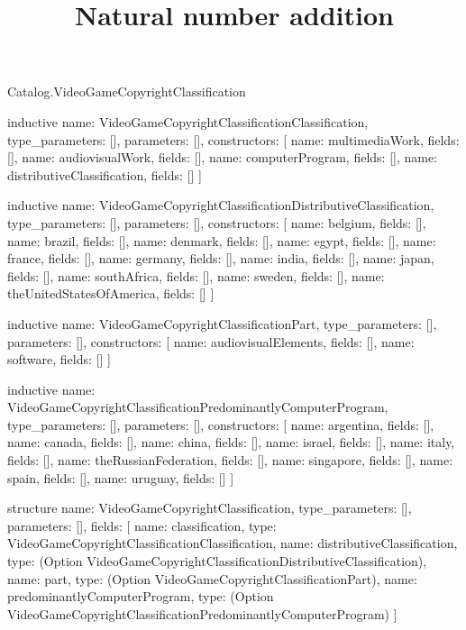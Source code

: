 \begin{lexlean}{Catalog.VideoGameCopyrightClassification}
\title{Natural number addition}
\begin{semanticmodule}
inductive{
  name: VideoGameCopyrightClassificationClassification,
  type_parameters: [],
  parameters: [],
  constructors: [
    {name: multimediaWork, fields: []},
    {name: audiovisualWork, fields: []},
    {name: computerProgram, fields: []},
    {name: distributiveClassification, fields: []}
  ]
}

inductive{
  name: VideoGameCopyrightClassificationDistributiveClassification,
  type_parameters: [],
  parameters: [],
  constructors: [
    {name: belgium, fields: []},
    {name: brazil, fields: []},
    {name: denmark, fields: []},
    {name: egypt, fields: []},
    {name: france, fields: []},
    {name: germany, fields: []},
    {name: india, fields: []},
    {name: japan, fields: []},
    {name: southAfrica, fields: []},
    {name: sweden, fields: []},
    {name: theUnitedStatesOfAmerica, fields: []}
  ]
}

inductive{
  name: VideoGameCopyrightClassificationPart,
  type_parameters: [],
  parameters: [],
  constructors: [
    {name: audiovisualElements, fields: []},
    {name: software, fields: []}
  ]
}

inductive{
  name: VideoGameCopyrightClassificationPredominantlyComputerProgram,
  type_parameters: [],
  parameters: [],
  constructors: [
    {name: argentina, fields: []},
    {name: canada, fields: []},
    {name: china, fields: []},
    {name: israel, fields: []},
    {name: italy, fields: []},
    {name: theRussianFederation, fields: []},
    {name: singapore, fields: []},
    {name: spain, fields: []},
    {name: uruguay, fields: []}
  ]
}

structure{
  name: VideoGameCopyrightClassification,
  type_parameters: [],
  parameters: [],
  fields: [
    {name: classification, type: VideoGameCopyrightClassificationClassification},
    {name: distributiveClassification, type: (Option VideoGameCopyrightClassificationDistributiveClassification)},
    {name: part, type: (Option VideoGameCopyrightClassificationPart)},
    {name: predominantlyComputerProgram, type: (Option VideoGameCopyrightClassificationPredominantlyComputerProgram)}
  ]
}
\end{semanticmodule}
\end{lexlean}
